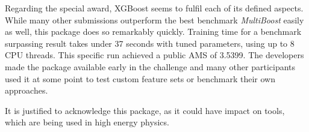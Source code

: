 Regarding the special award, XGBoost seems to fulfil each of its defined aspects. While many other submissions outperform the best benchmark \emph{MultiBoost} easily as well, this package does so remarkably quickly. Training time for a benchmark surpassing result takes under 37 seconds with tuned parameters, using up to 8 CPU threads. This specific run achieved a public AMS of 3.5399.
The developers made the package available early in the challenge and many other participants used it at some point to test custom feature sets or benchmark their own approaches.

It is justified to acknowledge this package, as it could have impact on tools, which are being used in high energy physics\cite{HEPml}.